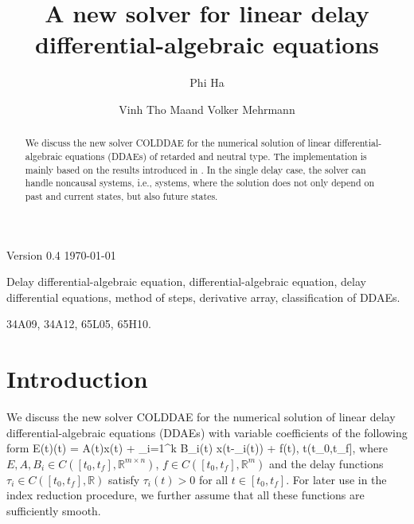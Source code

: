 \documentclass[final,reqno]{siamltex}
\begin{document}
\title{A new solver for linear delay differential-algebraic equations\footnotemark[1]}

\author{Phi Ha\footnotemark[2] \and Vinh Tho Ma\footnotemark[2] and Volker Mehrmann\footnotemark[2]}

\renewcommand{\thefootnote}{\fnsymbol{footnote}}


\maketitle

\newcommand{\thedate}{Version 0.4 \quad \today}

\begin{center}
\thedate
\end{center}

\vskip 0.2cm

\begin{abstract}
We discuss the new solver COLDDAE for the numerical solution of linear differential-algebraic equations (DDAEs) of retarded and neutral type. The implementation is mainly based on the results introduced in \cite{HaM14}. In the single delay case, the solver can handle noncausal systems, i.e., systems, where the solution does not only depend on past and current states, but also future states.
\end{abstract}

\begin{keywords} Delay differential-algebraic equation, differential-algebraic equation, delay differential equations, method of steps, derivative array, classification of DDAEs.
\end{keywords}

\begin{AMS}
34A09, 34A12, 65L05, 65H10.
\end{AMS}

\pagestyle{myheadings}
\thispagestyle{plain}

\section{Introduction}
We discuss the new solver COLDDAE for the numerical solution of linear delay differential-algebraic equations (DDAEs) with variable coefficients of the following form
%
\bsq\label{eq1.1}
\be\label{eq1.1a}
 E(t)(t) = A(t)x(t) + \sum_{i=1}^k B_i(t) x(t-\tau_i(t)) + f(t), \quad t\in (t_0,t_f],
\ee
%
where $E,A, B_i \in C([t_0,t_f],\mathbb{R}^{m\times n})$,
$f\in C([t_0,t_f],\mathbb{R}^{m})$ and 
the delay functions $\tau_i \in C([t_0,t_f],\mathbb{R})$ satisfy $\tau_i(t) > 0$ for all 
$t\in [t_0,t_f]$. For later use in the index reduction procedure, we further assume that all these functions are sufficiently smooth. 
\end{document}
